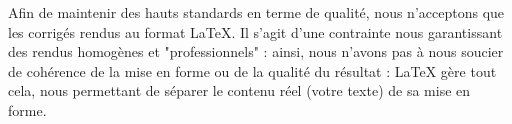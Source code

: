 ﻿Afin de maintenir des hauts standards en terme de qualité, nous n'acceptons que les corrigés rendus au format LaTeX. Il s'agit d'une contrainte nous garantissant des rendus homogènes et "professionnels" : ainsi, nous n'avons pas à nous soucier de cohérence de la mise en forme ou de la qualité du résultat : LaTeX gère tout cela, nous permettant de séparer le contenu réel (votre texte) de sa mise en forme.